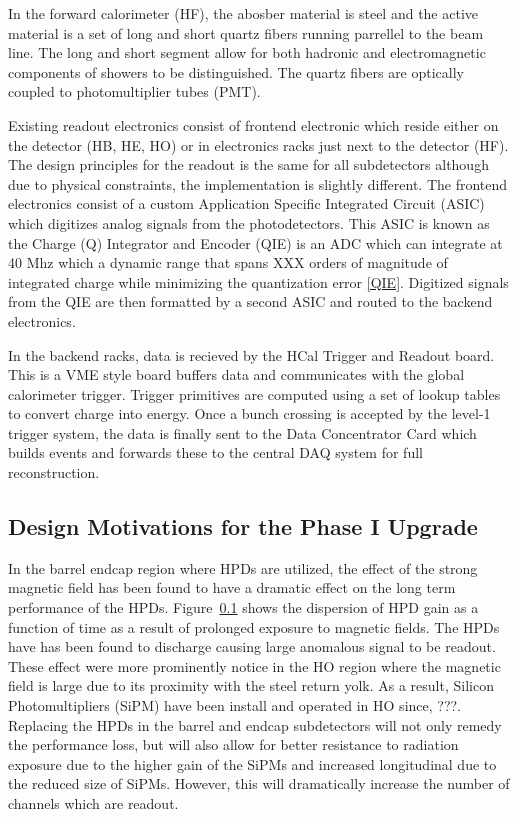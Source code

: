 \documentclass[11pt]{article} %
\begin{document}
In the forward calorimeter (HF), the abosber material is steel and the active material is a set of long and 
short quartz fibers running parrellel to the beam line.  The long and short segment allow for both hadronic
and electromagnetic components of showers to be distinguished.  The quartz fibers are optically coupled 
to photomultiplier tubes (PMT).  

Existing readout electronics consist of frontend electronic which reside either on the detector (HB, HE, HO)
or in electronics racks just next to the detector (HF).  The design principles for the readout is the same for
all subdetectors although due to physical constraints, the implementation is slightly different.  The frontend
electronics consist of a custom Application Specific Integrated Circuit (ASIC) which digitizes analog signals
from the photodetectors.  This ASIC is known as the Charge (Q) Integrator and Encoder (QIE) is an ADC which
can integrate at 40 Mhz which a dynamic range that spans XXX orders of magnitude of integrated charge 
while minimizing the quantization error \ref{QIE}.   Digitized signals from the QIE are then formatted by a
second ASIC and routed to the backend electronics. 


In the backend racks, data is recieved by the HCal Trigger and Readout board.  This is a VME style board buffers data and communicates with the global calorimeter trigger.  Trigger primitives are computed using a set of lookup tables to convert charge into energy.  Once a bunch crossing is accepted by the level-1 trigger system, the data is finally sent to the Data Concentrator Card which builds events and forwards these to the central DAQ system for full reconstruction.

\subsection{Design Motivations for the Phase I Upgrade}

In the barrel endcap region where HPDs are utilized, the effect of the strong magnetic field has been found
to have a dramatic effect on the long term performance of the HPDs.   Figure~\ref{} shows the dispersion of 
HPD gain as a function of time as a result of prolonged exposure to magnetic fields.  The HPDs have has
been found to discharge causing large anomalous signal to be readout.  These effect were more prominently 
notice in the HO region where the magnetic field is large due to its proximity with the steel return yolk.  As a 
result, Silicon Photomultipliers (SiPM) have been install and operated in HO since, ???.  Replacing the HPDs
in the barrel and endcap subdetectors will not only remedy the performance loss, but will also allow for
better resistance to radiation exposure due to the higher gain of the SiPMs and increased longitudinal
due to the reduced size of SiPMs.  However, this will dramatically increase the number of channels which are 
readout.  
\end{document}
